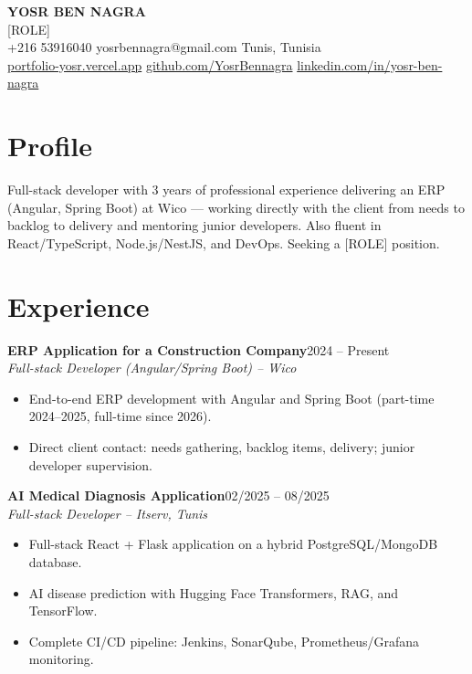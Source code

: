 \documentclass[10pt,a4paper]{article}
\newcommand{\role}[3]{%
  \textbf{#1}\hfill{\color{muted}\small #3}\\
  {\color{muted}\small\itshape #2}\par}
\begin{document}
\pagestyle{empty}

\begin{center}
  {\huge\bfseries YOSR BEN NAGRA}\\[5pt]
  {\color{muted}\normalsize [ROLE]}\\[7pt]  %
  {\color{muted}\small
    +216 53916040 \quad yosrbennagra@gmail.com \quad Tunis, Tunisia\\[2pt]
    \href{https://portfolio-yosr.vercel.app/en}{portfolio-yosr.vercel.app} \quad
    \href{https://github.com/YosrBennagra}{github.com/YosrBennagra} \quad
    \href{https://www.linkedin.com/in/yosr-ben-nagra/}{linkedin.com/in/yosr-ben-nagra}
  }
\end{center}

\section*{Profile}
\small
Full-stack developer with 3 years of professional experience delivering an ERP
(Angular, Spring Boot) at Wico --- working directly with the client from needs to
backlog to delivery and mentoring junior developers. Also fluent in React/TypeScript,
Node.js/NestJS, and DevOps. Seeking a [ROLE] position.

\section*{Experience}
\small
\role{ERP Application for a Construction Company}{Full-stack Developer (Angular/Spring Boot) -- Wico}{2024 -- Present}
\begin{itemize}[leftmargin=12pt,itemsep=1pt,topsep=3pt,parsep=0pt]
  \item End-to-end ERP development with Angular and Spring Boot (part-time 2024--2025, full-time since 2026).
  \item Direct client contact: needs gathering, backlog items, delivery; junior developer supervision.
\end{itemize}

\vspace{5pt}
\role{AI Medical Diagnosis Application}{Full-stack Developer -- Itserv, Tunis}{02/2025 -- 08/2025}
\begin{itemize}[leftmargin=12pt,itemsep=1pt,topsep=3pt,parsep=0pt]
  \item Full-stack React + Flask application on a hybrid PostgreSQL/MongoDB database.
  \item AI disease prediction with Hugging Face Transformers, RAG, and TensorFlow.
  \item Complete CI/CD pipeline: Jenkins, SonarQube, Prometheus/Grafana monitoring.
\end{itemize}
\end{document}
